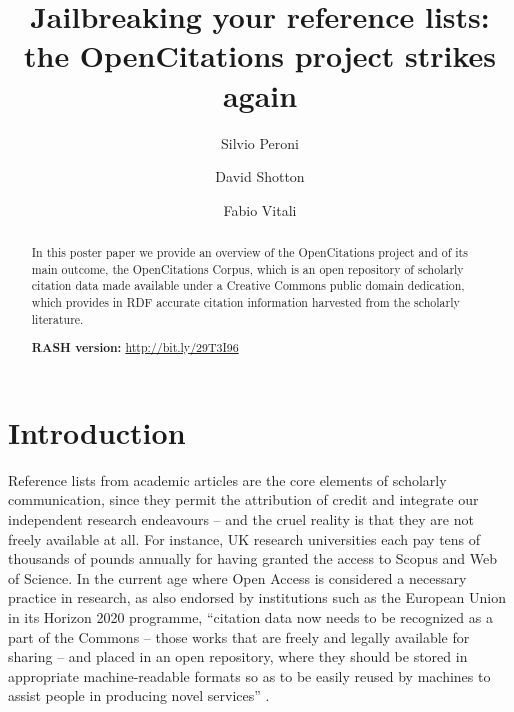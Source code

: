 \documentclass[runningheads,a4paper]{llncs}
\begin{document}
\mainmatter

\title{Jailbreaking your reference lists:\\ the OpenCitations project strikes again}
\author{Silvio Peroni \and
David Shotton \and
Fabio Vitali}
\maketitle

\begin{abstract}
In this poster paper we provide an overview of the OpenCitations project and of its main outcome, the OpenCitations Corpus, which is an open repository of scholarly citation data made available under a Creative Commons public domain dedication, which provides in RDF accurate citation information harvested from the scholarly literature.

{\bf RASH version:} \url{http://bit.ly/29T3I96}

\end{abstract}


\section{Introduction}

Reference lists from academic articles are the core elements of scholarly communication, since they permit the attribution of credit and integrate our independent research endeavours -- and the cruel reality is that they are not freely available at all. For instance, UK research universities each pay tens of thousands of pounds annually for having granted the access to Scopus and Web of Science. In the current age where Open Access is considered a necessary practice in research, as also endorsed by institutions such as the European Union in its Horizon 2020 programme, ``citation data now needs to be recognized as a part of the Commons -- those works that are freely and legally available for sharing -- and placed in an open repository, where they should be stored in appropriate machine-readable formats so as to be easily reused by machines to assist people in producing novel services'' \cite{__RefNumPara__293_1852566440}.
\end{document}
